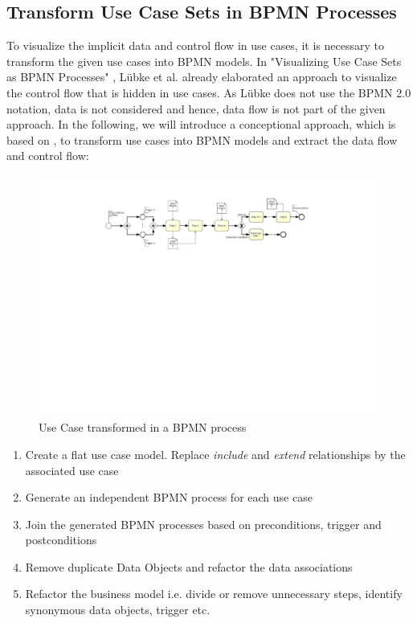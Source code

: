 \subsection{Transform Use Case Sets in BPMN Processes}
\label{sec:PrepApproach:TransformUCtoBPMN}
To visualize the implicit data and control flow in use cases, it is necessary to transform the given use cases into BPMN models. In "Visualizing Use Case Sets as BPMN Processes" \cite{VisualizeBPMN}, Lübke et al. already elaborated an approach to visualize the control flow that is hidden in use cases. As Lübke does not use the BPMN 2.0 notation, data is not considered and hence, data flow is not part of the given approach. In the following, we will introduce a conceptional approach, which is based on \cite{VisualizeBPMN}, to transform use cases into BPMN models and extract the data flow and control flow:

\begin{figure}[h!]
	\includegraphics[width=\textwidth, trim={6cm 14.5cm 6cm 1.5cm}]{img/usecaseTransformation.pdf}
	\caption{Use Case transformed in a BPMN process}
	\label{fig:useCaseTransformation}
\end{figure}

\begin{enumerate}
	\item Create a flat use case model. Replace \textit{include} and \textit{extend} relationships by the associated use case
	\item Generate an independent BPMN process for each use case
	\item Join the generated BPMN processes based on preconditions, trigger and postconditions
	\item Remove duplicate Data Objects and refactor the data associations
	\item Refactor the business model i.e. divide or remove unnecessary steps, identify synonymous data objects, trigger etc.
\end{enumerate}


